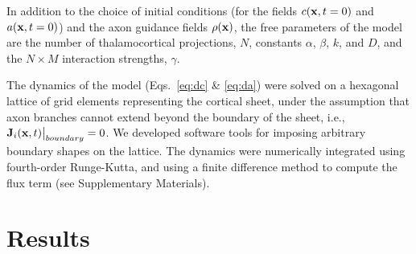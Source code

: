 \documentclass[9pt,twocolumn,twoside,lineno]{pnas-new}
\begin{document}
In addition to the choice of initial conditions (for the fields
$c(\mathbf{x},t=0)$ and $a(\mathbf{x},t=0)$) and the axon guidance fields
$\rho(\mathbf{x})$, the free parameters of the model are the number of
thalamocortical projections, $N$, constants $\alpha$, $\beta$, $k$, and $D$,
and the $N\times M$ interaction strengths, $\gamma$.

The dynamics of the model (Eqs.~\ref{eq:dc} \& \ref{eq:da}) were solved on a
hexagonal lattice of grid elements representing the cortical sheet, under the
assumption that axon branches cannot extend beyond the boundary of the sheet,
i.e., $\mathbf{J}_i(\mathbf{x},t) \big\rvert_{boundary} = 0$. We developed software
tools for imposing arbitrary boundary shapes on the lattice. The dynamics were
numerically integrated using fourth-order Runge-Kutta, and using a
{\color{red} finite difference method} to compute the flux term (see
Supplementary Materials).

\section*{Results}
\end{document}
